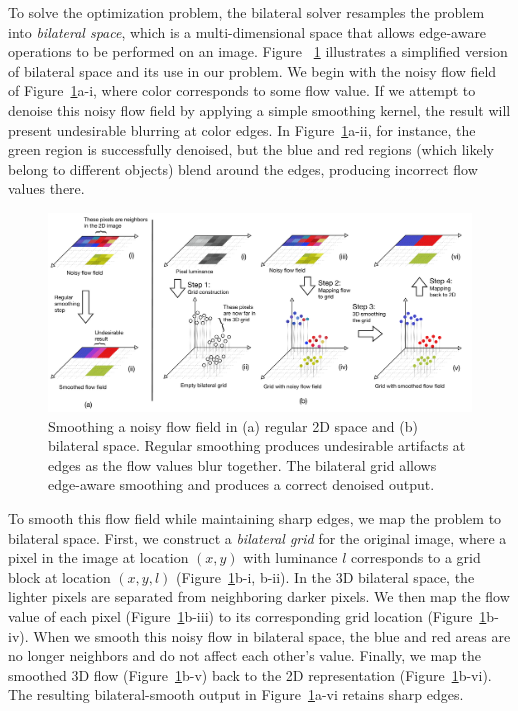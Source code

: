 To solve the optimization problem, the bilateral solver resamples the problem into \emph{bilateral space}, which is a multi-dimensional space that allows edge-aware operations to be performed on an image.
Figure ~\ref{fig:bilateral_grid_3d} illustrates a simplified version of bilateral space and its use in our problem.
We begin with the noisy flow field of Figure~\ref{fig:bilateral_grid_3d}a-i, where color corresponds to some flow value.
If we attempt to denoise this noisy flow field by applying a simple smoothing kernel, the result will present undesirable blurring at color edges.
In Figure~\ref{fig:bilateral_grid_3d}a-ii, for instance, the green region is successfully denoised, but the blue and red regions (which likely belong to different objects) blend around the edges, producing incorrect flow values there.

\begin{figure}[h]
  \includegraphics[width=.9\textwidth]{hfbs-figs/bilateral_grid_3d.pdf}
  \caption{Smoothing a noisy flow field in (a) regular 2D space and (b) bilateral space. Regular smoothing produces undesirable artifacts at edges as the flow values blur together. The bilateral grid allows edge-aware smoothing and produces a correct denoised output.}
  \label{fig:bilateral_grid_3d}
\end{figure}


To smooth this flow field while maintaining sharp edges, we map the problem to bilateral space.
First, we construct a \emph{bilateral grid} for the original image, where a pixel in the image at location $(x,y)$ with luminance $l$ corresponds to a grid block at location $(x,y,l)$ (Figure~\ref{fig:bilateral_grid_3d}b-i, b-ii).
In the 3D bilateral space, the lighter pixels are separated from neighboring darker pixels.
We then map the flow value of each pixel (Figure~\ref{fig:bilateral_grid_3d}b-iii) to its corresponding grid location (Figure~\ref{fig:bilateral_grid_3d}b-iv).
When we smooth this noisy flow in bilateral space, the blue and red areas are no longer neighbors and do not affect each other's value.
Finally, we map the smoothed 3D flow (Figure~\ref{fig:bilateral_grid_3d}b-v) back to the 2D representation (Figure~\ref{fig:bilateral_grid_3d}b-vi).
The resulting  bilateral-smooth output in Figure~\ref{fig:bilateral_grid_3d}a-vi retains sharp edges.
